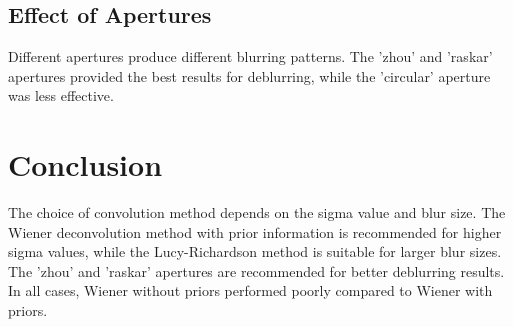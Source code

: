 \documentclass[a4paper,10pt]{article}
\begin{document}
\subsection{Effect of Apertures}
Different apertures produce different blurring patterns. The 'zhou' and 'raskar' apertures provided the best 
results for deblurring, while the 'circular' aperture was less effective.

\section{Conclusion}
The choice of convolution method depends on the sigma value and blur size. 
The Wiener deconvolution method with prior information is recommended for higher sigma values, 
while the Lucy-Richardson method is suitable for larger blur sizes. 
The 'zhou' and 'raskar' apertures are recommended for better deblurring results. 
In all cases, Wiener without priors performed poorly compared to Wiener with priors.
\end{document}
